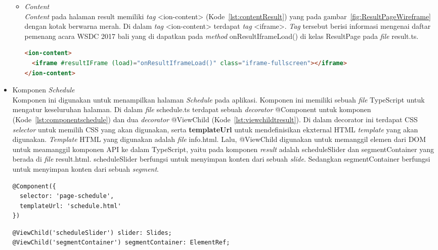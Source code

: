 \begin{itemize}
\begin{itemize}
\newpage 
		\item \textit{Content}\\
		\textit{Content} pada halaman result memiliki \textit{tag} <ion-content> (Kode~\ref{lst:contentResult}) yang pada gambar~\ref{fig:ResultPageWireframe} dengan kotak berwarna merah. Di dalam \textit{tag} <ion-content> terdapat \textit{tag} <iframe>. \textit{Tag} tersebut berisi informasi mengenai daftar pemenang acara WSDC 2017 bali yang di dapatkan pada \textit{method} onResultIframeLoad() di kelas ResultPage pada \textit{file} result.ts.
		
\begin{lstlisting}[language=html, label={lst:contentResult}, caption=\textit{Content} pada result.html]
<ion-content>
  <iframe #resultIFrame (load)="onResultIframeLoad()" class="iframe-fullscreen"></iframe>
</ion-content>
\end{lstlisting} 
	\end{itemize}
	
	\item Komponen \textit{Schedule}\\ 
	Komponen ini digunakan untuk menampilkan halaman \textit{Schedule} pada aplikasi. Komponen ini memiliki sebuah \textit{file} TypeScript untuk mengatur keseluruhan halaman. Di dalam \textit{file} schedule.ts terdapat sebuah \textit{decorator} @Component untuk komponen (Kode~\ref{lst:componentschedule}) dan dua \textit{decorator} @ViewChild (Kode~\ref{lst:viewchildtresult}). Di dalam decorator ini terdapat CSS \textit{selector} untuk memilih CSS yang akan digunakan, serta \textbf{templateUrl} untuk mendefinisikan ekxternal HTML \textit{template} yang akan digunakan. \textit{Template} HTML yang digunakan adalah \textit{file} info.html. Lalu, @ViewChild digunakan untuk memanggil elemen dari DOM untuk meamanggil komponen API ke dalam TypeScript, yaitu pada komponen \textit{result} adalah scheduleSlider dan segmentContainer yang berada di \textit{file} result.html. scheduleSlider berfungsi untuk menyimpan konten dari sebuah \textit{slide}. Sedangkan segmentContainer berfungsi untuk menyimpan konten dari sebuah \textit{segment}.
	
\begin{lstlisting}[language=html, label={lst:componentschedule}, caption=@Component pada schedule.ts]
@Component({
  selector: 'page-schedule',
  templateUrl: 'schedule.html'
})
\end{lstlisting}

\begin{lstlisting}[language=html, label={lst:viewchildtresult}, caption=@ViewChild pada schedule.ts]
@ViewChild('scheduleSlider') slider: Slides;
@ViewChild('segmentContainer') segmentContainer: ElementRef;
\end{lstlisting} 


\end{itemize}

